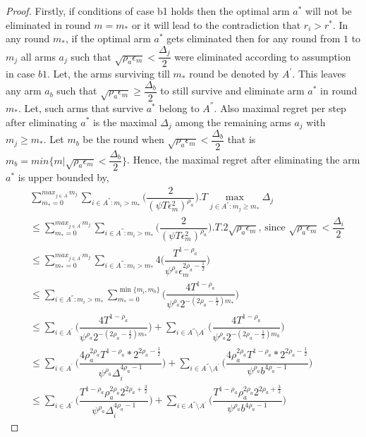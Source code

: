 \begin{proof}
	Firstly, if conditions of case b1 holds then the optimal arm $a^{*}$ will not be eliminated in round $m=m_{*}$ or it will lead to the contradiction that $r_{i}>r^{*}$. In any round $m_{*}$, if the optimal arm $a^{*}$ gets eliminated then for any round from $1$ to $m_{j}$ all arms $a_{j}$ such that $\sqrt{\rho_{a}\epsilon_{m}}<\dfrac{\Delta_{j}}{2}$ were eliminated according to assumption in case $b1$. Let, the arms surviving till $m_{*}$ round be denoted by $A^{'}$. This leaves any arm $a_{b}$ such that $\sqrt{\rho_{a}\epsilon_{m}}\geq\dfrac{\Delta_{b}}{2}$ to still survive and eliminate arm $a^{*}$ in round $m_{*}$. Let, such arms that survive $a^{*}$ belong to $A^{''}$. Also maximal regret per step after eliminating $a^{*}$ is the maximal $\Delta_{j}$ among the remaining arms $a_{j}$ with $m_{j}\geq m_{*}$.  Let $m_{b}$ be the round when $\sqrt{\rho_{a}\epsilon_{m}}<\dfrac{\Delta_{b}}{2}$ that is $m_{b}=min\lbrace m|\sqrt{\rho_{a}\epsilon_{m}}<\dfrac{\Delta_{b}}{2}\rbrace$. Hence, the 
maximal regret after eliminating the arm $a^{*}$ is upper bounded by, 
\begin{align*}
&\sum_{m_{*}=0}^{max_{j\in A^{'}}m_{j}}\sum_{i\in A^{''}:m_{i}>m_{*}}\bigg(\dfrac{2}{(\psi  T\epsilon_{m}^{2})^{\rho_{a}}} \bigg).T\max_{j\in A^{''}:m_{j}\geq m_{*}}{\Delta}_{j}\\
&\leq\sum_{m_{*}=0}^{max_{j\in A^{'}}m_{j}}\sum_{i\in A^{''}:m_{i}>m_{*}}\bigg(\dfrac{2}{(\psi  T\epsilon_{m}^{2})^{\rho_{a}}} \bigg).T.2\sqrt{\rho_{a}\epsilon_{m}}\text{, since } \sqrt{\rho_{a}\epsilon_{m}}<\dfrac{\Delta_{i}}{2}\\
&\leq\sum_{m_{*}=0}^{max_{j\in A^{'}}m_{j}}\sum_{i\in A^{''}:m_{i}>m_{*}}4\bigg(\dfrac{T^{1-\rho_{a}}}{\psi^{\rho_{a}}\epsilon_{m}^{2\rho_{a}-\frac{1}{2}}} \bigg)\\
&\leq\sum_{i\in A^{''}:m_{i}>m_{*}}\sum_{m_{*}=0}^{\min{\lbrace m_{i},m_{b}\rbrace}}\bigg(\dfrac{4T^{1-\rho_{a}}}{\psi^{\rho_{a}}2^{-(2\rho_{a}-\frac{1}{2})m_{*}}} \bigg)\\
&\leq\sum_{i\in A^{'}}\bigg(\dfrac{4T^{1-\rho_{a}}}{\psi^{\rho_{a}}2^{-(2\rho_{a}-\frac{1}{2})m_{*}}} \bigg)+\sum_{i\in A^{''}\setminus A^{'}}\bigg(\dfrac{4T^{1-\rho_{a}}}{\psi^{\rho_{a}}2^{-(2\rho_{a}-\frac{1}{2})m_{b}}} \bigg)\\
&\leq\sum_{i\in A^{'}}\bigg(\dfrac{4\rho_{a}^{2\rho_{a}}T^{1-\rho_{a}}*2^{2\rho_{a}-\frac{1}{2}}}{\psi^{\rho_{a}}\Delta_{i}^{4\rho_{a}-1}} \bigg)+\sum_{i\in A^{''}\setminus A^{'}}\bigg(\dfrac{4\rho_{a}^{2\rho_{a}}T^{1-\rho_{a}}*2^{2\rho_{a}-\frac{1}{2}}}{\psi^{\rho_{a}}b^{4\rho_{a}-1}} \bigg)\\
&\leq\sum_{i\in A^{'}}\bigg(\dfrac{T^{1-\rho_{a}}\rho_{a}^{2\rho_{a}}2^{2\rho_{a}+\frac{3}{2}}}{\psi^{\rho_{a}}\Delta_{i}^{4\rho_{a}-1}} \bigg)+\sum_{i\in A^{''}\setminus A^{'}}\bigg(\dfrac{T^{1-\rho_{a}}\rho_{a}^{2\rho_{a}}2^{2\rho_{a}+\frac{3}{2}}}{\psi^{\rho_{a}}b^{4\rho_{a}-1}} \bigg)
\end{align*}


\end{proof}
